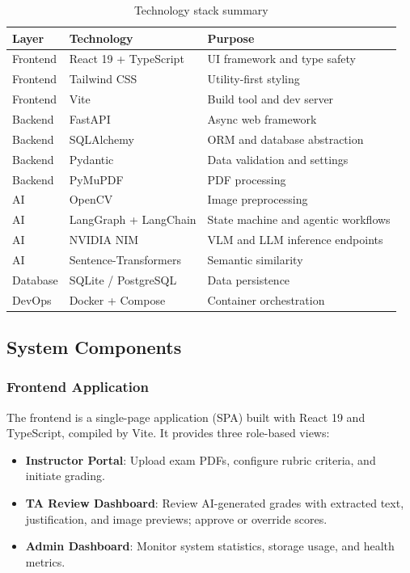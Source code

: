\documentclass[11pt,a4paper]{article}
\begin{document}
\begin{table}[H]
    \centering
    \caption{Technology stack summary}
    \label{tab:tech-stack}
    \begin{tabular}{@{}lll@{}}
        \toprule
        \textbf{Layer} & \textbf{Technology} & \textbf{Purpose} \\
        \midrule
        Frontend & React 19 + TypeScript & UI framework and type safety \\
        Frontend & Tailwind CSS & Utility-first styling \\
        Frontend & Vite & Build tool and dev server \\
        Backend & FastAPI & Async web framework \\
        Backend & SQLAlchemy & ORM and database abstraction \\
        Backend & Pydantic & Data validation and settings \\
        Backend & PyMuPDF & PDF processing \\
        AI & OpenCV & Image preprocessing \\
        AI & LangGraph + LangChain & State machine and agentic workflows \\
        AI & NVIDIA NIM & VLM and LLM inference endpoints \\
        AI & Sentence-Transformers & Semantic similarity \\
        Database & SQLite / PostgreSQL & Data persistence \\
        DevOps & Docker + Compose & Container orchestration \\
        \bottomrule
    \end{tabular}
\end{table}

\subsection{System Components}

\subsubsection{Frontend Application}
The frontend is a single-page application (SPA) built with React 19 and TypeScript, compiled by Vite. It provides three role-based views:

\begin{itemize}[leftmargin=2em]
    \item \textbf{Instructor Portal}: Upload exam PDFs, configure rubric criteria, and initiate grading.
    \item \textbf{TA Review Dashboard}: Review AI-generated grades with extracted text, justification, and image previews; approve or override scores.
    \item \textbf{Admin Dashboard}: Monitor system statistics, storage usage, and health metrics.
\end{itemize}
\end{document}
